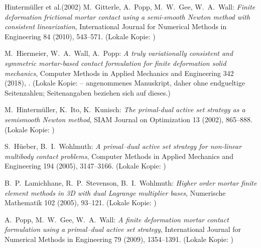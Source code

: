 \documentclass[a4paper,11pt]{article}
\begin{document}
\begin{thebibliography}{Hintermüller et al.(2002)}
 M.~Gitterle, A.~Popp, M.~W.~Gee, W.~A.~Wall: \emph{Finite deformation frictional mortar contact using a semi-smooth Newton method with consistent linearization}, International Journal for Numerical Methods in Engineering 84 (2010), 543--571. (Lokale Kopie: )

 M.~Hiermeier, W.~A.~Wall, A.~Popp: \emph{A truly variationally consistent and symmetric mortar-based contact formulation for finite deformation solid mechanics}, Computer Methods in Applied Mechanics and Engineering 342 (2018), . (Lokale Kopie:  -- angenommenes Manuskript, daher ohne endgueltige Seitenzahlen; Seitenangaben beziehen sich auf dieses.)

 M.~Hintermüller, K.~Ito, K.~Kunisch: \emph{The primal-dual active set strategy as a semismooth Newton method}, SIAM Journal on Optimization 13 (2002), 865--888. (Lokale Kopie: )

 S.~H\"ueber, B.~I.~Wohlmuth: \emph{A primal--dual active set strategy for non-linear multibody contact problems}, Computer Methods in Applied Mechanics and Engineering 194 (2005), 3147--3166. (Lokale Kopie: )

 B.~P.~Lamichhane, R.~P.~Stevenson, B.~I.~Wohlmuth: \emph{Higher order mortar finite element methods in 3D with dual Lagrange multiplier bases}, Numerische Mathematik 102 (2005), 93--121. (Lokale Kopie: )

 A.~Popp, M.~W.~Gee, W.~A.~Wall: \emph{A finite deformation mortar contact formulation using a primal--dual active set strategy}, International Journal for Numerical Methods in Engineering 79 (2009), 1354--1391. (Lokale Kopie: )


\end{thebibliography}
\end{document}
